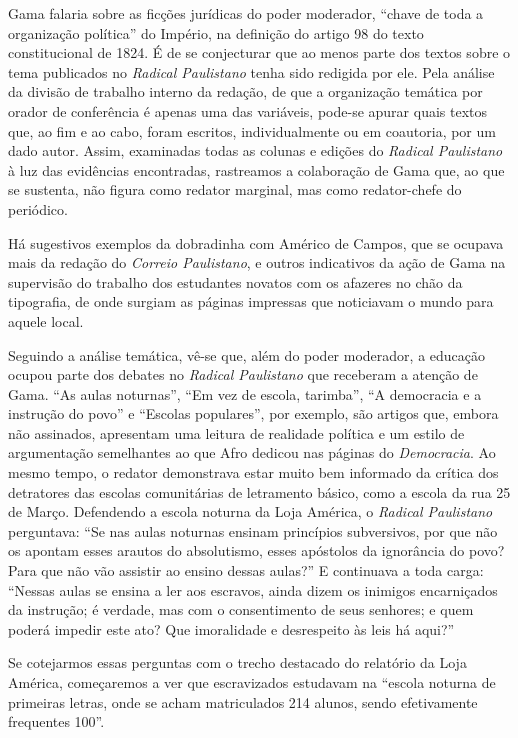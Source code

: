 Gama falaria sobre as ficções jurídicas do poder moderador, ``chave de
toda a organização política'' do Império, na definição do artigo 98 do
texto constitucional de 1824. É de se conjecturar que ao menos parte dos
textos sobre o tema publicados no \emph{Radical Paulistano} tenha sido
redigida por ele. Pela análise da divisão de trabalho interno da
redação, de que a organização temática por orador de conferência é
apenas uma das variáveis, pode-se apurar quais textos que, ao fim e ao
cabo, foram escritos, individualmente ou em coautoria, por um dado
autor. Assim, examinadas todas as colunas e edições do \emph{Radical
Paulistano} à luz das evidências encontradas, rastreamos a colaboração
de Gama que, ao que se sustenta, não figura como redator marginal, mas
como redator-chefe do periódico.

Há sugestivos exemplos da dobradinha com Américo de Campos, que se
ocupava mais da redação do \emph{Correio Paulistano}, e outros
indicativos da ação de Gama na supervisão do trabalho dos estudantes
novatos com os afazeres no chão da tipografia, de onde surgiam as
páginas impressas que noticiavam o mundo para aquele local.

Seguindo a análise temática, vê-se que, além do poder moderador, a
educação ocupou parte dos debates no \emph{Radical Paulistano} que
receberam a atenção de Gama. ``As aulas noturnas'', ``Em vez de
escola, tarimba'', ``A democracia e a instrução do povo'' e ``Escolas
populares'', por exemplo, são artigos que, embora não assinados,
apresentam uma leitura de realidade política e um estilo de argumentação
semelhantes ao que Afro dedicou nas páginas do \emph{Democracia}.
Ao mesmo tempo, o redator demonstrava estar muito bem informado da
crítica dos detratores das escolas comunitárias de letramento básico,
como a escola da rua 25 de Março. Defendendo a escola noturna da Loja
América, o \emph{Radical Paulistano} perguntava: ``Se nas aulas noturnas
ensinam princípios subversivos, por que não os apontam esses arautos do
absolutismo, esses apóstolos da ignorância do povo? Para que não vão
assistir ao ensino dessas aulas?'' E continuava a toda carga: ``Nessas
aulas se ensina a ler aos escravos, ainda dizem os inimigos encarniçados
da instrução; é verdade, mas com o consentimento de seus senhores; e
quem poderá impedir este ato? Que imoralidade e desrespeito às leis há
aqui?''

Se cotejarmos essas perguntas com o trecho destacado do relatório da
Loja América, começaremos a ver que escravizados estudavam na ``escola
noturna de primeiras letras, onde se acham matriculados 214 alunos,
sendo efetivamente frequentes 100''.


